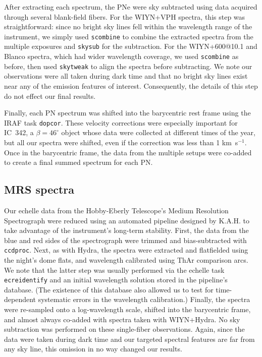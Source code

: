 \documentclass[12pt,preprint]{emulateapj}
\newcommand{\kms}{km~s$^{-1}$}
\begin{document}
After extracting each spectrum, the PNe were sky subtracted using data acquired through several blank-field fibers.  For the WIYN+VPH spectra, this step was straightforward:  since no bright sky lines fell within the wavelength range of the instrument, we simply used {\tt scombine} to combine the extracted spectra from the multiple exposures and {\tt skysub} for the subtraction.  For the WIYN+600@10.1 and Blanco spectra, which had wider wavelength coverage, we used {\tt scombine} as before, then used {\tt skytweak} to align the spectra before subtracting.  We note our observations were all taken during dark time and that no bright sky lines exist near any of the emission features of interest.  Consequently, the details of this step do not effect our final results.

Finally, each PN spectrum was shifted into the barycentric rest frame using the IRAF task {\tt dopcor}.  These velocity corrections were especially important for IC~342, a $\beta = 46^\circ$ object whose data were collected at different times of the year, but all our spectra were shifted, even if the correction was less than 1 \kms.  Once in the barycentric frame, the data from the multiple setups were co-added to create a final summed spectrum for each PN.

\subsection{MRS spectra}
Our echelle data from the Hobby-Eberly Telescope's Medium Resolution Spectrograph were reduced using an automated pipeline designed by K.A.H. to take advantage of the instrument's long-term stability.  First, the data from the blue and red sides of the spectrograph were trimmed and bias-subtracted with {\tt ccdproc}.  Next, as with Hydra, the spectra were extracted and flatfielded using the night's dome flats, and wavelength calibrated using ThAr comparison arcs.  We note that the latter step was usually performed via the echelle task {\tt ecreidentify} and an initial wavelength solution stored in the pipeline's database.  (The existence of this database also allowed us to test for time-dependent systematic errors in the wavelength calibration.)  Finally, the spectra were re-sampled onto a log-wavelength scale, shifted into the barycentric frame, and almost always co-added with spectra taken with WIYN+Hydra.  No sky subtraction was performed on these single-fiber observations.  Again, since the data were taken during dark time and our targeted spectral features are far from any sky line, this omission in no way changed our results.  
\end{document}
